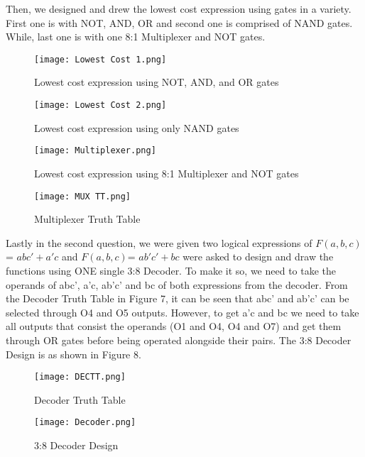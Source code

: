 \documentclass[pdftex,12pt,a4paper]{article}
\begin{document}
Then, we designed and drew the lowest cost expression using gates in a variety. First one is with NOT, AND, OR and second one is comprised of NAND gates. While, last one is with one 8:1 Multiplexer and NOT gates.

\begin{figure}[ht]
	\centering
	\texttt{[image: Lowest Cost 1.png]}
	\caption{Lowest cost expression using NOT, AND, and OR gates}
	\label{fig1}
\end{figure}

\begin{figure}[ht]
	\centering
	\texttt{[image: Lowest Cost 2.png]}	
	\caption{Lowest cost expression using only NAND gates}
	\label{fig1}
\end{figure}

\begin{figure}[ht]
	\centering
	\texttt{[image: Multiplexer.png]}
	\caption{Lowest cost expression using 8:1 Multiplexer and NOT gates}
	\label{fig1}
\end{figure}




\begin{figure}[ht]
	\centering
	\texttt{[image: MUX TT.png]}
	\caption{Multiplexer Truth Table}
	\label{fig1}
\end{figure}



Lastly in the second question, we were given two logical expressions of \( F(a, b, c) \)= \(abc' + a'c\) and \( F(a, b, c) \)= \(ab'c' + bc\) were asked to design and draw the functions using ONE single 3:8 Decoder. To make it so, we need to take the operands of abc', a'c, ab'c' and bc of both expressions from the decoder. From the Decoder Truth Table in Figure 7, it can be seen that abc' and ab'c' can be selected through O4 and O5 outputs. However, to get a'c and bc we need to take all outputs that consist the operands (O1 and O4, O4 and O7) and get them through OR gates before being operated alongside their pairs. The 3:8 Decoder Design is as shown in Figure 8.  

\begin{figure}[ht]
	\centering
	\texttt{[image: DECTT.png]}
	\caption{Decoder Truth Table}
	\label{fig1}
\end{figure}

\begin{figure}[ht]
	\centering
	\texttt{[image: Decoder.png]}
	\caption{3:8 Decoder Design}
	\label{fig1}
\end{figure}
\newpage
\end{document}
